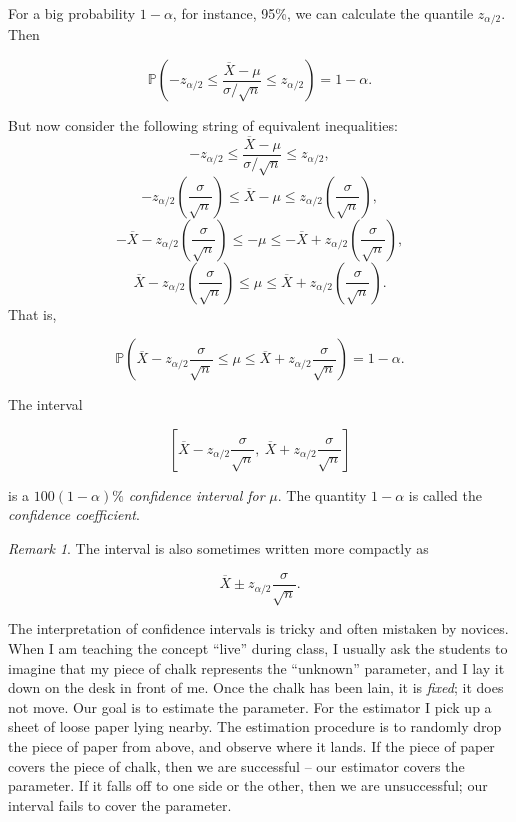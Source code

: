 \documentclass[]{book}
\numberwithin{equation}{chapter}
\numberwithin{figure}{chapter}
\theoremstyle{plain}
\theoremstyle{definition}
\theoremstyle{remark}
\theoremstyle{definition}
\theoremstyle{definition}
\theoremstyle{remark}
\newtheorem*{remark}{Remark}
\let\BeginKnitrBlock\begin \let\EndKnitrBlock\end
\begin{document}
For a big probability \(1-\alpha\), for instance, 95\%, we can calculate
the quantile \(z_{\alpha/2}\). Then

\begin{equation}
\mathbb{P}\left(-z_{\alpha/2}\leq\frac{\overline{X}-\mu}{\sigma/\sqrt{n}}\leq z_{\alpha/2}\right)=1-\alpha.
\end{equation}

But now consider the following string of equivalent inequalities: \[
-z_{\alpha/2}\leq\frac{\overline{X}-\mu}{\sigma/\sqrt{n}}\leq z_{\alpha/2},
\] \[
-z_{\alpha/2}\left(\frac{\sigma}{\sqrt{n}}\right)\leq\overline{X}-\mu\leq z_{\alpha/2}\left(\frac{\sigma}{\sqrt{n}}\right),
\] \[
-\overline{X} - z_{\alpha/2}\left(\frac{\sigma}{\sqrt{n}}\right)\leq - \mu \leq - \overline{X} + z_{\alpha/2} \left( \frac{\sigma}{\sqrt{n}} \right),
\] \[
\overline{X} - z_{\alpha/2} \left( \frac{\sigma}{\sqrt{n}} \right) \leq \mu \leq \overline{X} + z_{\alpha/2} \left( \frac{\sigma}{\sqrt{n}} \right).
\] That is,

\begin{equation}
\mathbb{P}\left(\overline{X}-z_{\alpha/2}\frac{\sigma}{\sqrt{n}}\leq\mu\leq\overline{X}+z_{\alpha/2}\frac{\sigma}{\sqrt{n}}\right)=1-\alpha.
\end{equation}

\bigskip

\BeginKnitrBlock{definition}
\protect\hypertarget{def:unnamed-chunk-354}{}{\label{def:unnamed-chunk-354}}The
interval

\begin{equation}
\left[\overline{X}-z_{\alpha/2}\frac{\sigma}{\sqrt{n}},\ \overline{X}+z_{\alpha/2}\frac{\sigma}{\sqrt{n}}\right]
\end{equation}

is a \(100(1-\alpha)\%\) \emph{confidence interval for} \(\mu\). The
quantity \(1-\alpha\) is called the \emph{confidence coefficient}.
\EndKnitrBlock{definition}

\bigskip

\begin{remark}
The interval is also sometimes written more compactly as

\begin{equation}
\label{eq-z-interval}
\overline{X}\pm z_{\alpha/2}\frac{\sigma}{\sqrt{n}}.
\end{equation}
\end{remark}

The interpretation of confidence intervals is tricky and often mistaken
by novices. When I am teaching the concept ``live'' during class, I
usually ask the students to imagine that my piece of chalk represents
the ``unknown'' parameter, and I lay it down on the desk in front of me.
Once the chalk has been lain, it is \emph{fixed}; it does not move. Our
goal is to estimate the parameter. For the estimator I pick up a sheet
of loose paper lying nearby. The estimation procedure is to randomly
drop the piece of paper from above, and observe where it lands. If the
piece of paper covers the piece of chalk, then we are successful -- our
estimator covers the parameter. If it falls off to one side or the
other, then we are unsuccessful; our interval fails to cover the
parameter.
\end{document}
